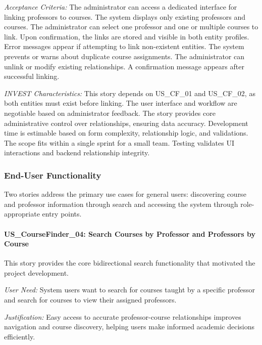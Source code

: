 \documentclass[12pt,a4paper]{article}
\begin{document}
\textit{Acceptance Criteria:} The administrator can access a dedicated interface for linking professors to courses. The system displays only existing professors and courses. The administrator can select one professor and one or multiple courses to link. Upon confirmation, the links are stored and visible in both entity profiles. Error messages appear if attempting to link non-existent entities. The system prevents or warns about duplicate course assignments. The administrator can unlink or modify existing relationships. A confirmation message appears after successful linking.\newline

\textit{INVEST Characteristics:} This story depends on US\_CF\_01 and US\_CF\_02, as both entities must exist before linking. The user interface and workflow are negotiable based on administrator feedback. The story provides core administrative control over relationships, ensuring data accuracy. Development time is estimable based on form complexity, relationship logic, and validations. The scope fits within a single sprint for a small team. Testing validates UI interactions and backend relationship integrity.

\subsubsection{End-User Functionality}

Two stories address the primary use cases for general users: discovering course and professor information through search and accessing the system through role-appropriate entry points.\newline

\paragraph{US\_CourseFinder\_04: Search Courses by Professor and Professors by Course}

This story provides the core bidirectional search functionality that motivated the project development.\newline

\textit{User Need:} System users want to search for courses taught by a specific professor and search for courses to view their assigned professors.\newline

\textit{Justification:} Easy access to accurate professor-course relationships improves navigation and course discovery, helping users make informed academic decisions efficiently.\newline
\end{document}
